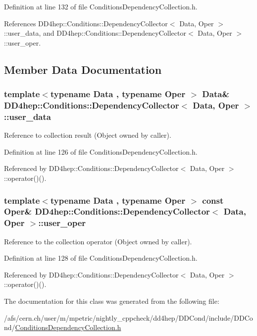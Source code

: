 Definition at line 132 of file ConditionsDependencyCollection.h.

References DD4hep::Conditions::DependencyCollector$<$ Data, Oper $>$::user\_\-data, and DD4hep::Conditions::DependencyCollector$<$ Data, Oper $>$::user\_\-oper.

\subsection{Member Data Documentation}
\hypertarget{class_d_d4hep_1_1_conditions_1_1_dependency_collector_a65456b4691406f0da2334732909465a0}{
\subsubsection[{user\_\-data}]{\setlength{\rightskip}{0pt plus 5cm}template$<$typename Data , typename Oper $>$ Data\& {\bf DD4hep::Conditions::DependencyCollector}$<$ Data, Oper $>$::{\bf user\_\-data}}}
\label{class_d_d4hep_1_1_conditions_1_1_dependency_collector_a65456b4691406f0da2334732909465a0}


Reference to collection result (Object owned by caller). 

Definition at line 126 of file ConditionsDependencyCollection.h.

Referenced by DD4hep::Conditions::DependencyCollector$<$ Data, Oper $>$::operator()().\hypertarget{class_d_d4hep_1_1_conditions_1_1_dependency_collector_af0056586d4f62f93837c38e0ec32ba5a}{
\subsubsection[{user\_\-oper}]{\setlength{\rightskip}{0pt plus 5cm}template$<$typename Data , typename Oper $>$ const Oper\& {\bf DD4hep::Conditions::DependencyCollector}$<$ Data, Oper $>$::{\bf user\_\-oper}}}
\label{class_d_d4hep_1_1_conditions_1_1_dependency_collector_af0056586d4f62f93837c38e0ec32ba5a}


Reference to the collection operator (Object owned by caller). 

Definition at line 128 of file ConditionsDependencyCollection.h.

Referenced by DD4hep::Conditions::DependencyCollector$<$ Data, Oper $>$::operator()().

The documentation for this class was generated from the following file:\begin{DoxyCompactItemize}
\item 
/afs/cern.ch/user/m/mpetric/nightly\_\-cppcheck/dd4hep/DDCond/include/DDCond/\hyperlink{_conditions_dependency_collection_8h}{ConditionsDependencyCollection.h}\end{DoxyCompactItemize}

